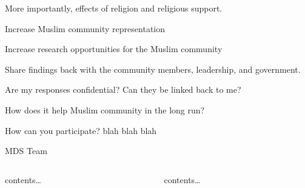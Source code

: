 \documentclass[
  ignorenonframetext,
  aspectratio=169,
]{beamer}
\begin{document}
\begin{frame}{More importantly, effects of religion and religious
support.}
\label{more-importantly-effects-of-religion-and-religious-support.}
\end{frame}

\begin{frame}{Increase Muslim community representation}
\label{increase-muslim-community-representation}
\end{frame}

\begin{frame}{Increase research opportunities for the Muslim community}
\label{increase-research-opportunities-for-the-muslim-community}
\end{frame}

\begin{frame}{Share findings back with the community members,
leadership, and government.}
\label{share-findings-back-with-the-community-members-leadership-and-government.}
\end{frame}

\begin{frame}{Are my responses confidential?}
\label{are-my-responses-confidential}
Can they be linked back to me?
\end{frame}

\begin{frame}{How does it help Muslim community in the long run?}
\label{how-does-it-help-muslim-community-in-the-long-run}
\end{frame}

\begin{frame}{How can you participate?}
\label{how-can-you-participate}
blah blah blah
\end{frame}

\begin{frame}{MDS Team}
\label{mds-team}
\begin{columns}[T]
\begin{column}{0.4\textwidth}
contents\ldots{}
\end{column}

\begin{column}{0.6\textwidth}
contents\ldots{}
\end{column}
\end{columns}
\end{frame}
\end{document}
